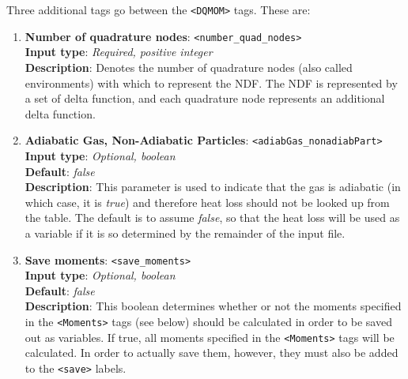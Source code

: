 Three additional tags go between the \verb=<DQMOM>= tags.  These are:

\begin{enumerate}
%
\item {\bf Number of quadrature nodes}: \verb=<number_quad_nodes>= \\
{\bf Input type}: {\it Required, positive integer} \\
{\bf Description}: Denotes the number of quadrature nodes (also called environments) with which to represent the NDF. The NDF is represented by a set of delta function, and each quadrature node represents an additional delta function.
%
\item {\bf Adiabatic Gas, Non-Adiabatic Particles}: \verb=<adiabGas_nonadiabPart>= \\
{\bf Input type}: {\it Optional, boolean} \\
{\bf Default}: {\it false} \\
{\bf Description}: This parameter is used to indicate that the gas is adiabatic (in which case, it is {\it true}) and therefore heat loss should not be looked up from the table.  The default is to assume {\it false}, so that the heat loss will be used as a variable if it is so determined by the remainder of the input file.
%
\item {\bf Save moments}: \verb=<save_moments>= \\
{\bf Input type}: {\it Optional, boolean} \\
{\bf Default}: {\it false} \\
{\bf Description}: This boolean determines whether or not the moments specified in the \verb=<Moments>= tags (see below) should be calculated in order to be saved out as variables.  If true, all moments specified in the \verb=<Moments>= tags will be calculated.  In order to actually save them, however, they must also be added to the \verb=<save>= labels.
%
\end{enumerate}



